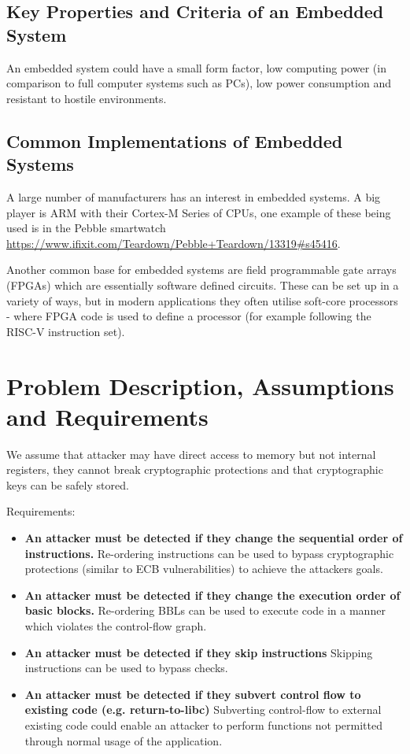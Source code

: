 \subsection{Key Properties and Criteria of an Embedded System}\label{propertiesEmbeddedSystems}
An embedded system could have a small form factor, low computing power (in comparison to full computer systems such as PCs), low power consumption and resistant to hostile environments.

\subsection{Common Implementations of Embedded Systems}\label{implementationsEmbeddedSystems}
A large number of manufacturers has an interest in embedded systems. A big player is ARM with their Cortex-M Series of CPUs, one example of these being used is in the Pebble smartwatch \url{https://www.ifixit.com/Teardown/Pebble+Teardown/13319#s45416}.

Another common base for embedded systems are field programmable gate arrays (FPGAs) which are essentially software defined circuits. These can be set up in a variety of ways, but in modern applications they often utilise soft-core processors - where FPGA code is used to define a processor (for example following the RISC-V instruction set).

\section{Problem Description, Assumptions and Requirements}

We assume that attacker may have direct access to memory but not internal registers, they cannot break cryptographic protections and that cryptographic keys can be safely stored.

Requirements: 
\begin{itemize}
	\item \textbf{An attacker must be detected if they change the sequential order of instructions.} Re-ordering instructions can be used to bypass cryptographic protections (similar to ECB vulnerabilities) to achieve the attackers goals.
	\item \textbf{An attacker must be detected if they change the execution order of basic blocks.} Re-ordering BBLs can be used to execute code in a manner which violates the control-flow graph.
	\item \textbf{An attacker must be detected if they skip instructions} Skipping instructions can be used to bypass checks.
	\item \textbf{An attacker must be detected if they subvert control flow to existing code (e.g. return-to-libc)} Subverting control-flow to external existing code could enable an attacker to perform functions not permitted through normal usage of the application.
\end{itemize}

